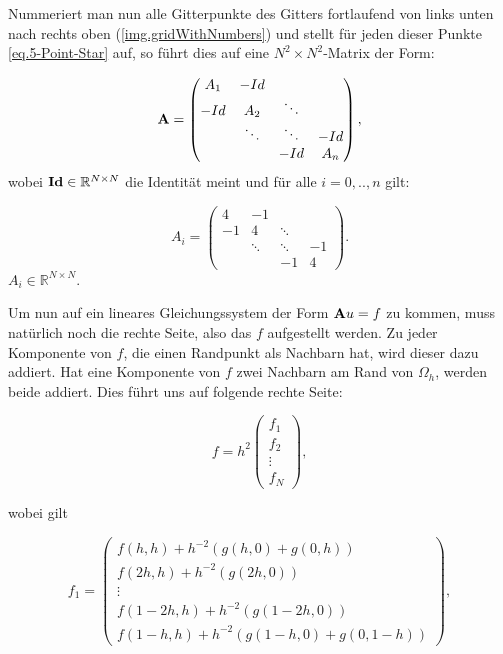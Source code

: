\label{img.gridWithNumbers}

Nummeriert man nun alle Gitterpunkte des Gitters fortlaufend von links unten nach rechts oben (\autoref{img.gridWithNumbers}) und stellt für jeden dieser Punkte \autoref{eq.5-Point-Star} auf, so führt dies auf eine $N^{2} \times N^{2}$-Matrix der Form:

\begin{equation}
{\textbf{A}} =
\begin{pmatrix}
A_{1} & -Id \\
-Id & A_{2} & \ddots \\
 & \ddots & \ddots & -Id \\
 & & -Id & A_{n}
\end{pmatrix},\label{eq.2D Matrix}
\end{equation}
wobei ${\textbf{Id}} \in \mathbb{R}^{N \times N}$ die Identität meint und für alle $i = 0,..,n$ gilt:

\begin{equation}
A_{i} = 
\begin{pmatrix}
4 & -1 & & \\
-1 & 4 & \ddots & \\
 & \ddots & \ddots & -1 \\
 & & -1 & 4
\end{pmatrix}.
\end{equation}
$A_{i} \in \mathbb{R}^{N \times N}$.

Um nun auf ein lineares Gleichungssystem der Form ${\textbf{A}}u = f$ zu kommen, muss natürlich noch die rechte Seite, also das $f$ aufgestellt werden. Zu jeder Komponente von $f$, die einen Randpunkt als Nachbarn hat, wird dieser dazu addiert. Hat eine Komponente von $f$ zwei Nachbarn am Rand von $\Omega_{h}$, werden beide addiert. Dies führt uns auf folgende rechte Seite:

\begin{equation}
f = h^{2}
\begin{pmatrix}
f_{1} \\ f_{2} \\ \vdots \\ f_{N}
\end{pmatrix},
\end{equation}

wobei gilt

\begin{equation}
f_{1} = 
\begin{pmatrix}
f(h,h) + h^{-2}(g(h,0)+g(0,h)) \\
f(2h,h) + h^{-2}(g(2h,0)) \\
\vdots \\
f(1-2h,h) + h^{-2}(g(1-2h,0)) \\
f(1-h,h) + h^{-2}(g(1-h,0)+g(0,1-h))
\end{pmatrix},
\end{equation}

